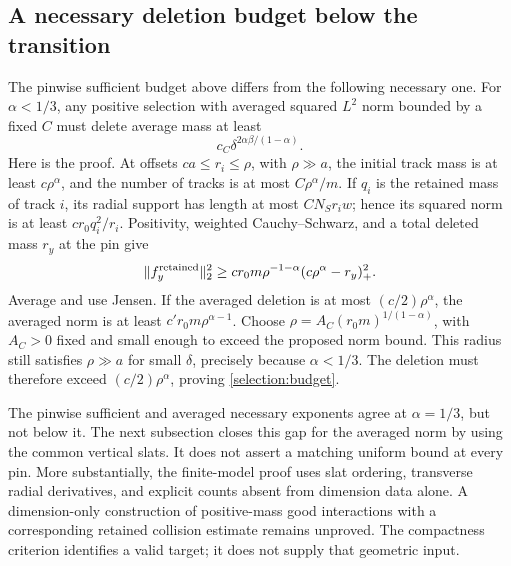 \subsection{A necessary deletion budget below the transition}
\label{selection:budget-section}
The pinwise sufficient budget above differs from the following necessary
one. For \(\alpha<1/3\), any positive selection with averaged squared
\(L^2\) norm bounded by a fixed \(C\) must delete average mass at least
\begin{equation}\label{selection:budget}
 c_C\delta^{2\alpha\beta/(1-\alpha)}.
\end{equation}
Here is the proof. At offsets \(ca\le r_i\le\rho\), with \(\rho\gg a\),
the initial track mass is at least \(c\rho^\alpha\), and the number
of tracks is at most \(C\rho^\alpha/m\). If \(q_i\) is the retained
mass of track \(i\), its radial support has length at most
\(CN_Sr_iw\); hence its squared norm is at least
\(cr_0q_i^2/r_i\). Positivity, weighted Cauchy--Schwarz, and a total
deleted mass \(r_y\) at the pin give
\[
 \|f_y^{\rm retained}\|_2^2
 \ge c r_0m\rho^{-1-\alpha}(c\rho^\alpha-r_y)_+^2.
\]
Average and use Jensen. If the averaged deletion is at most
\((c/2)\rho^\alpha\), the averaged norm is at least
\(c'r_0m\rho^{\alpha-1}\). Choose
\(\rho=A_C(r_0m)^{1/(1-\alpha)}\), with \(A_C>0\) fixed and small
enough to exceed the proposed norm bound. This radius still satisfies
\(\rho\gg a\) for small \(\delta\), precisely because \(\alpha<1/3\).
The deletion must therefore exceed \((c/2)\rho^\alpha\), proving
\eqref{selection:budget}.

The pinwise sufficient and averaged necessary exponents agree at
\(\alpha=1/3\), but not below it. The next subsection closes this gap
for the averaged norm by using the common vertical slats. It does not
assert a matching uniform bound at every pin.
More substantially, the finite-model proof uses slat ordering, transverse
radial derivatives, and explicit counts absent from dimension data alone.
A dimension-only construction of positive-mass good interactions with a
corresponding retained collision estimate remains unproved. The compactness
criterion identifies a valid target; it does not supply that geometric input.
